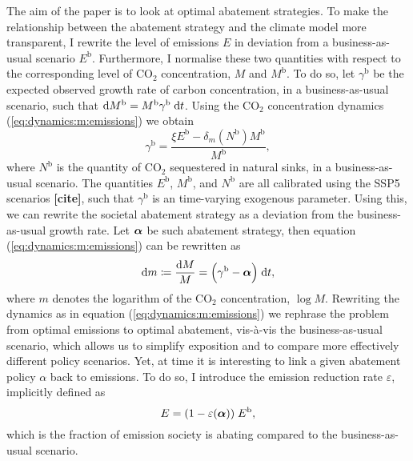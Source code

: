 \documentclass[../../main.tex]{subfiles}
\begin{document}
The aim of the paper is to look at optimal abatement strategies. To make the relationship between the abatement strategy and the climate model more transparent, I rewrite the level of emissions $E$ in deviation from a business-as-usual scenario $E^{\mathrm{b}}$. Furthermore, I normalise these two quantities with respect to the corresponding level of CO$_2$ concentration, $M$ and $M^{\mathrm{b}}$. To do so, let $\gamma^{\mathrm{b}}$ be the expected observed growth rate of carbon concentration, in a business-as-usual scenario, such that $\mathrm{d}M^{\mathrm{b}} = M^{\mathrm{b}} \gamma^{\mathrm{b}} \; \mathrm{d}t$. Using the CO$_2$ concentration dynamics (\ref{eq:dynamics:m:emissions}) we obtain \begin{equation} \label{eq:growth-rate-bau}
    \gamma^{\mathrm{b}} = \frac{\xi E^{\mathrm{b}} - \delta_m(N^{\mathrm{b}}) M^{\mathrm{b}}}{M^{\mathrm{b}}},
\end{equation} where $N^{\mathrm{b}}$ is the quantity of CO$_2$ sequestered in natural sinks, in a business-as-usual scenario. The quantities $E^{\mathrm{b}}$, $M^{\mathrm{b}}$, and $N^{\mathrm{b}}$ are all calibrated using the SSP5 scenarios \textbf{[cite]}, such that $\gamma^{\mathrm{b}}$ is an time-varying exogenous parameter. Using this, we can rewrite the societal abatement strategy as a deviation from the business-as-usual growth rate. Let $\bm{\alpha}$ be such abatement strategy, then equation (\ref{eq:dynamics:m:emissions}) can be rewritten as \begin{equation} \label{eq:dynamics:m:abatement}
    \mathrm{d}m \coloneqq \frac{\mathrm{d}M}{M} = \Big( \gamma^{\mathrm{b}} - \bm{\alpha} \Big)\; \mathrm{d}t,
\end{equation} where $m$ denotes the logarithm of the CO$_2$ concentration, $\log M$. Rewriting the dynamics as in equation (\ref{eq:dynamics:m:emissions}) we rephrase the problem from optimal emissions to optimal abatement, vis-à-vis the business-as-usual scenario, which allows us to simplify exposition and to compare more effectively different policy scenarios. Yet, at time it is interesting to link a given abatement policy $\alpha$ back to emissions. To do so, I introduce the emission reduction rate $\varepsilon$, implicitly defined as \begin{equation} \label{eq:emission-reduction-rate}
    E = (1 - \varepsilon(\bm{\alpha})) \; E^{\mathrm{b}},
\end{equation} which is the fraction of emission society is abating compared to the business-as-usual scenario.
\end{document}

